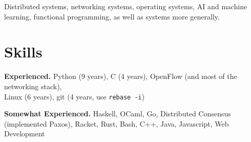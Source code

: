 \documentclass[10pt]{article}
\begin{document}
Distributed systems, networking systems, operating systems, AI and machine learning, 
functional programming, as well as systems more generally.

\section{Skills}

\begin{trivlist}
    \item \textbf{Experienced.} Python (9 years), C (4 years), 
          OpenFlow (and most of the networking stack), \\ Linux (6 years), 
          git (4 years, use \texttt{rebase -i})
    \item \textbf{Somewhat Experienced.} Haskell, OCaml, Go, Distributed 
          Consensus (implemented Paxos), Racket, Rust, Bash, C++, 
          Java, Javascript, Web Development
\end{trivlist}
\end{document}
